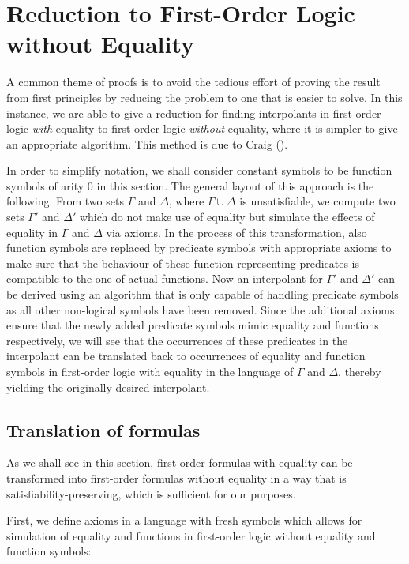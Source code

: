 \chapter{Reduction to First-Order Logic without Equality}
\label{chap:reduction}

A common theme of proofs is to avoid the tedious effort of proving the result from first principles by reducing the problem to one that is easier to solve.
In this instance, we are able to give a reduction for finding interpolants in first-order logic \emph{with} equality to first-order logic \emph{without} equality, where it is simpler to give an appropriate algorithm.
This method is due to Craig (\cite{Craig57linear,Craig57three}).

In order to simplify notation, we shall consider constant symbols to be function symbols of arity $0$ in this section.
The general layout of this approach is the following:
From two sets $\Gamma$ and $\Delta$, where $\Gamma \cup \Delta$ is unsatisfiable, we compute two sets $\Gamma'$ and $\Delta'$ which do not make use of equality but simulate the effects of equality in $\Gamma$ and $\Delta$ via axioms.
In the process of this transformation, also function symbols are replaced by predicate symbols with appropriate axioms to make sure that the behaviour of these function-representing predicates is compatible to the one of actual functions.
Now an interpolant for $\Gamma'$ and $\Delta'$ can be derived using an algorithm that is only capable of handling predicate symbols as all other non-logical symbols have been removed.
Since the additional axioms ensure that the newly added predicate symbols mimic equality and functions respectively, we will see that the occurrences of these predicates in the interpolant can be translated back to occurrences of equality and function symbols in first-order logic with equality in the language of $\Gamma$ and $\Delta$, thereby yielding the originally desired interpolant.


\section{Translation of formulas}

As we shall see in this section, first-order formulas with equality can be transformed into first-order formulas without equality in a way that is satisfiability-preserving, which is sufficient for our purposes.

First, we define axioms in a language with fresh symbols which allows for simulation of equality and functions in first-order logic without equality and function symbols:

